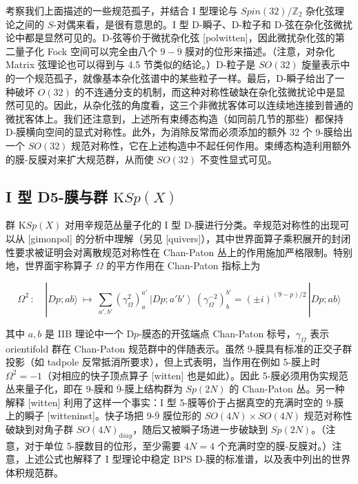 \documentclass[11pt,a4paper]{ctexart}
\newcommand{\SrcRange}[2]{\marginpar{\raggedright\footnotesize 原文 p.#1}}
\begin{document}
考察我们上面描述的一些规范孤子，并结合 I 型理论与 \(Spin(32)/{\mathbb{Z}}_2\) 杂化弦理论之间的 \(S\)-对偶来看，是很有意思的。I 型 D-瞬子、D-粒子和 D-弦在杂化弦微扰论中都是显然可见的。D-弦等价于微扰杂化弦 [polwitten]，因此微扰杂化弦的第二量子化 Fock 空间可以完全由八个 \(9-\overline{9}\) 膜对的位形来描述。（注意，对杂化 Matrix 弦理论也可以得到与 4.5 节类似的结论。）D-粒子是 \(SO(32)\) 旋量表示中的一个规范孤子，就像基本杂化弦谱中的某些粒子一样。最后，D-瞬子给出了一种破坏 \(O(32)\) 的不连通分支的机制，而这种对称性破缺在杂化弦微扰论中是显然可见的。因此，从杂化弦的角度看，这三个非微扰客体可以连续地连接到普通的微扰客体上。我们还注意到，上述所有束缚态构造（如同前几节的那些）都保持 D-膜横向空间的显式对称性。此外，为消除反常而必须添加的额外 32 个 9-膜给出一个 \(SO(32)\) 规范对称性，它在上述构造中不起任何作用。束缚态构造利用额外的膜-反膜对来扩大规范群，从而使 \(SO(32)\) 不变性显式可见。

\SrcRange{61}{61}
\subsection{\texorpdfstring{I 型 D5-膜与群 \({\mathrm KSp}(X)\)}{I 型 D5-膜与群 \{\textbackslash mathrm KSp\}(X)}}\label{i-ux578b-d5-ux819cux4e0eux7fa4-mathrm-kspx}

群 \({\mathrm KSp}(X)\) 对用辛规范丛量子化的 I 型 D-膜进行分类。辛规范对称性的出现可以从 [gimonpol] 的分析中理解（另见 [quivers]），其中世界面算子乘积展开的封闭性要求被证明会对离散规范对称性在 Chan-Paton 丛上的作用施加严格限制。特别地，世界面宇称算子 \(\Omega\) 的平方作用在 Chan-Paton 指标上为

\[\Omega^2\,:\,~~~~|Dp;ab\rangle~\longmapsto~\sum_{a',b'}\left
(\gamma_\Omega^2\right)^{a'}_a\,\left|
Dp;a'b'\right\rangle\,\left(\gamma_\Omega^{-2}\right
)^{b'}_b=(\pm i)^{(9-p)/2}\,|Dp;ab\rangle\]

其中 \(a,b\) 是 IIB 理论中一个 D\(p\)-膜态的开弦端点 Chan-Paton 标号，\(\gamma_{\Omega}\) 表示 orientifold 群在 Chan-Paton 规范群中的伴随表示。虽然 9-膜具有标准的正交子群投影（如 tadpole 反常抵消所要求），但上式表明，当作用在例如 5-膜上时 \(\Omega^2=-1\)（对相应的快子顶点算子 [witten] 也是如此）。因此 5-膜必须用伪实规范丛来量子化，即在 9-膜和 \(\overline{9}\)-膜上结构群为 \(Sp(2N)\) 的 Chan-Paton 丛。另一种解释 [witten] 利用了这样一个事实：I 型 5-膜等价于占据真空的充满时空的 9-膜上的瞬子 [witteninst]。快子场把 9-\(\overline{9}\) 膜位形的 \(SO(4N)\times SO(4N)\) 规范对称性破缺到对角子群 \(SO(4N)_{\mathrm diag}\)，随后又被瞬子场进一步破缺到 \(Sp(2N)\)。（注意，对于单位 5-膜数目的位形，至少需要 \(4N=4\) 个充满时空的膜-反膜对。）注意，上述公式也解释了 I 型理论中稳定 BPS D-膜的标准谱，以及表中列出的世界体积规范群。
\end{document}
